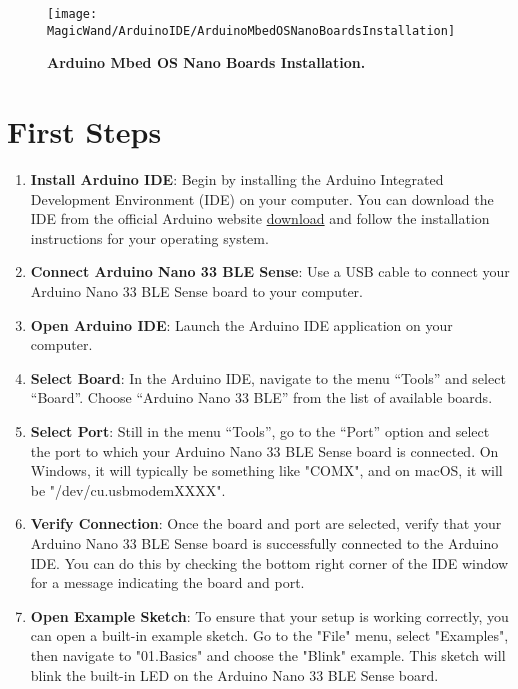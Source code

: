 \begin{figure}[H]\centering
    \texttt{[image: MagicWand/ArduinoIDE/ArduinoMbedOSNanoBoardsInstallation]}
    \caption{\textbf{Arduino Mbed OS Nano Boards Installation.}}
    \label{fig:Arduino Mbed OS Nano Boards Installation}		
\end{figure}


\section{First Steps}

\begin{enumerate}
    \item \textbf{Install Arduino IDE}: Begin by installing the Arduino Integrated Development Environment (IDE) on your computer. You can download the IDE from the official Arduino website \href{https://www.arduino.cc/en/software}{download} and follow the installation instructions for your operating system.\cite{Fezari:2018}
    
    \item \textbf{Connect Arduino Nano 33 BLE Sense}: Use a USB cable to connect your Arduino Nano 33 BLE Sense board to your computer.
    
    \item \textbf{Open Arduino IDE}: Launch the Arduino IDE application on your computer.
    
    \item \textbf{Select Board}: In the Arduino IDE, navigate to the menu ``Tools'' and select ``Board''. Choose ``Arduino Nano 33 BLE'' from the list of available boards.
    
    \item \textbf{Select Port}: Still in the menu ``Tools'', go to the ``Port'' option and select the port to which your Arduino Nano 33 BLE Sense board is connected. On Windows, it will typically be something like "COMX", and on macOS, it will be "/dev/cu.usbmodemXXXX".
    
    \item \textbf{Verify Connection}: Once the board and port are selected, verify that your Arduino Nano 33 BLE Sense board is successfully connected to the Arduino IDE. You can do this by checking the bottom right corner of the IDE window for a message indicating the board and port.
    
    \item \textbf{Open Example Sketch}: To ensure that your setup is working correctly, you can open a built-in example sketch. Go to the "File" menu, select "Examples", then navigate to "01.Basics" and choose the "Blink" example. This sketch will blink the built-in LED on the Arduino Nano 33 BLE Sense board.
    

\end{enumerate}
